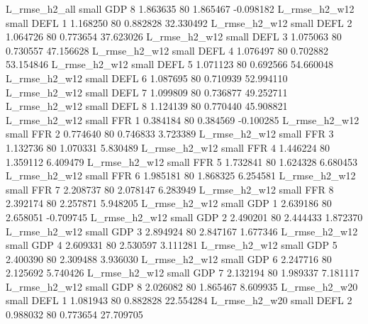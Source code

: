  L_rmse_h2_all      small      GDP                 8 1.863635 80       1.865467          -0.098182
 L_rmse_h2_w12      small     DEFL                 1 1.168250 80       0.882828          32.330492
 L_rmse_h2_w12      small     DEFL                 2 1.064726 80       0.773654          37.623026
 L_rmse_h2_w12      small     DEFL                 3 1.075063 80       0.730557          47.156628
 L_rmse_h2_w12      small     DEFL                 4 1.076497 80       0.702882          53.154846
 L_rmse_h2_w12      small     DEFL                 5 1.071123 80       0.692566          54.660048
 L_rmse_h2_w12      small     DEFL                 6 1.087695 80       0.710939          52.994110
 L_rmse_h2_w12      small     DEFL                 7 1.099809 80       0.736877          49.252711
 L_rmse_h2_w12      small     DEFL                 8 1.124139 80       0.770440          45.908821
 L_rmse_h2_w12      small      FFR                 1 0.384184 80       0.384569          -0.100285
 L_rmse_h2_w12      small      FFR                 2 0.774640 80       0.746833           3.723389
 L_rmse_h2_w12      small      FFR                 3 1.132736 80       1.070331           5.830489
 L_rmse_h2_w12      small      FFR                 4 1.446224 80       1.359112           6.409479
 L_rmse_h2_w12      small      FFR                 5 1.732841 80       1.624328           6.680453
 L_rmse_h2_w12      small      FFR                 6 1.985181 80       1.868325           6.254581
 L_rmse_h2_w12      small      FFR                 7 2.208737 80       2.078147           6.283949
 L_rmse_h2_w12      small      FFR                 8 2.392174 80       2.257871           5.948205
 L_rmse_h2_w12      small      GDP                 1 2.639186 80       2.658051          -0.709745
 L_rmse_h2_w12      small      GDP                 2 2.490201 80       2.444433           1.872370
 L_rmse_h2_w12      small      GDP                 3 2.894924 80       2.847167           1.677346
 L_rmse_h2_w12      small      GDP                 4 2.609331 80       2.530597           3.111281
 L_rmse_h2_w12      small      GDP                 5 2.400390 80       2.309488           3.936030
 L_rmse_h2_w12      small      GDP                 6 2.247716 80       2.125692           5.740426
 L_rmse_h2_w12      small      GDP                 7 2.132194 80       1.989337           7.181117
 L_rmse_h2_w12      small      GDP                 8 2.026082 80       1.865467           8.609935
 L_rmse_h2_w20      small     DEFL                 1 1.081943 80       0.882828          22.554284
 L_rmse_h2_w20      small     DEFL                 2 0.988032 80       0.773654          27.709705
